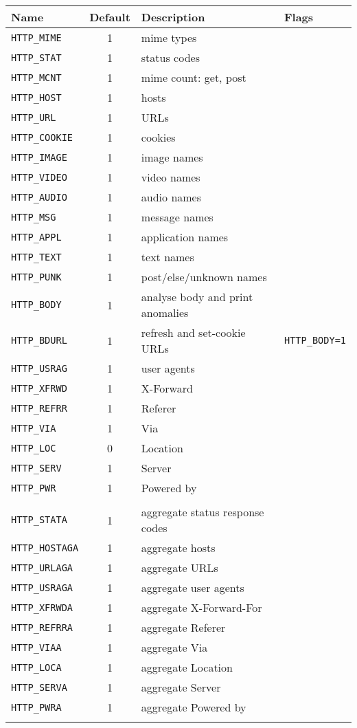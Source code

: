 \documentclass[documentation]{subfiles}
\begin{document}
\begin{longtable}{lcll}
    \toprule
    {\bf Name} & {\bf Default} & {\bf Description} & {\bf Flags}\\
    \midrule\endhead%
    {\tt HTTP\_MIME}   & 1 & mime types\\
    {\tt HTTP\_STAT}   & 1 & status codes\\
    {\tt HTTP\_MCNT}   & 1 & mime count: get, post \\
    {\tt HTTP\_HOST}   & 1 & hosts\\
    {\tt HTTP\_URL}    & 1 & URLs\\
    {\tt HTTP\_COOKIE} & 1 & cookies\\
    {\tt HTTP\_IMAGE}  & 1 & image names\\
    {\tt HTTP\_VIDEO}  & 1 & video names\\
    {\tt HTTP\_AUDIO}  & 1 & audio names\\
    {\tt HTTP\_MSG}    & 1 & message names\\
    {\tt HTTP\_APPL}   & 1 & application names\\
    {\tt HTTP\_TEXT}   & 1 & text names\\
    {\tt HTTP\_PUNK}   & 1 & post/else/unknown names\\
    {\tt HTTP\_BODY}   & 1 & analyse body and print anomalies\\
    {\tt HTTP\_BDURL}  & 1 & refresh and set-cookie URLs & {\tt HTTP\_BODY=1}\\
    {\tt HTTP\_USRAG}  & 1 & user agents \\
    {\tt HTTP\_XFRWD}  & 1 & X-Forward \\
    {\tt HTTP\_REFRR}  & 1 & Referer \\
    {\tt HTTP\_VIA}    & 1 & Via \\
    {\tt HTTP\_LOC}    & 0 & Location \\
    {\tt HTTP\_SERV}   & 1 & Server \\
    {\tt HTTP\_PWR}    & 1 & Powered by \\\\

    {\tt HTTP\_STATA}   & 1 & aggregate status response codes\\
    {\tt HTTP\_HOSTAGA} & 1 & aggregate hosts\\
    {\tt HTTP\_URLAGA}  & 1 & aggregate URLs\\
    {\tt HTTP\_USRAGA}  & 1 & aggregate user agents\\
    {\tt HTTP\_XFRWDA}  & 1 & aggregate X-Forward-For \\
    {\tt HTTP\_REFRRA}  & 1 & aggregate Referer \\
    {\tt HTTP\_VIAA}    & 1 & aggregate Via \\
    {\tt HTTP\_LOCA}    & 1 & aggregate Location \\
    {\tt HTTP\_SERVA}   & 1 & aggregate Server \\
    {\tt HTTP\_PWRA}    & 1 & aggregate Powered by \\\\


\end{longtable}
\end{document}
